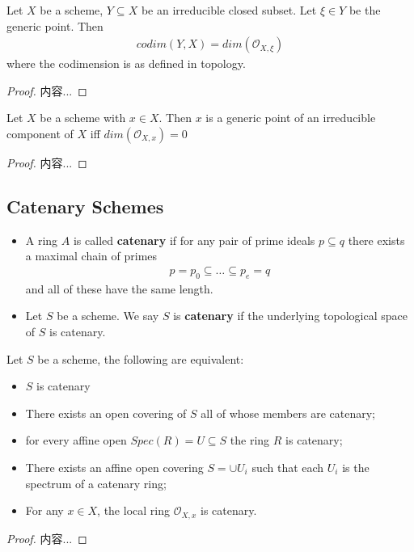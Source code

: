 \documentclass[Total.tex]{subfiles}
\begin{document}
			\begin{lemma}
				Let $X$ be a scheme, $Y\subseteq X$ be an irreducible closed subset. Let $\xi\in Y$ be the generic point. Then
				\begin{gather*}
					codim(Y,X)=dim(\mathcal{O}_{X,\xi})
				\end{gather*}
				where the codimension is as defined in topology.
			\end{lemma}
			\begin{proof}
				内容...
			\end{proof}
			
			\begin{lemma}
				Let $X$ be a scheme with $x\in X$. Then $x$ is a generic point of an irreducible component of $X$ iff $dim(\mathcal{O}_{X,x})=0$
			\end{lemma}
			\begin{proof}
				内容...
			\end{proof}
			
			\subsection{Catenary Schemes}
				\begin{Def}
					\begin{itemize}
						\item A ring $A$ is called \textbf{catenary} if for any pair of prime ideals $p\subseteq q$ there exists a maximal chain of primes
						\begin{gather*}
							p=p_0\subseteq \dots\subseteq p_e=q
						\end{gather*}
						and all of these have the same length.
						\item Let $S$ be a scheme. We say $S$ is \textbf{catenary} if the underlying topological space of $S$ is catenary.
					\end{itemize}
				\end{Def}
				\begin{lemma}
					Let $S$ be a scheme, the following are equivalent:
					\begin{itemize}
						\item $S$ is catenary
						\item There exists an open covering of $S$ all of whose members are catenary;
						\item for every affine open $Spec(R)=U\subseteq S$ the ring $R$ is catenary;
						\item There exists an affine open covering $S=\cup U_i$ such that each $U_i$ is the spectrum of a catenary ring;
						\item For any $x\in X$, the local ring $\mathcal{O}_{X,x}$ is catenary.
					\end{itemize}
				\end{lemma}
				\begin{proof}
					内容...
				\end{proof}
\end{document}
